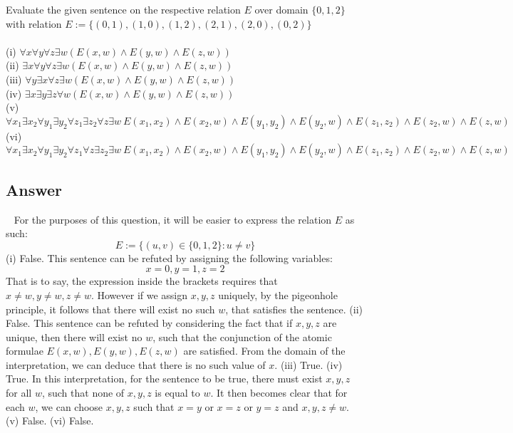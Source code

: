 \documentclass[12pt]{fphw}
\begin{document}
\begin{problem}
  Evaluate the given sentence on the respective relation $E$ over domain $\{0,1,2\}$ with relation $E := \{(0,1),(1,0),(1,2),(2,1),(2,0),(0,2)\}$\\ \\
  (i) $\forall x \forall y \forall z \exists w (E(x,w) \wedge E(y,w) \wedge E(z,w))$ \\
  (ii) $\exists x \forall y \forall z \exists w (E(x,w) \wedge E(y,w) \wedge E(z,w))$ \\
  (iii) $\forall y \exists x \forall z \exists w (E(x,w) \wedge E(y,w) \wedge E(z,w))$ \\
  (iv) $\exists x \exists y \exists z \forall w (E(x,w) \wedge E(y,w) \wedge E(z,w))$ \\
  (v) $\forall x_1 \exists x_2 \forall y_1 \exists y_2 \forall z_1 \exists z_2 \forall z \exists w \ E(x_1, x_2) \wedge E(x_2, w) \wedge E(y_1, y_2) \wedge E(y_2, w) \wedge E(z_1, z_2) \wedge E(z_2, w) \wedge E(z,w)$ \\
  (vi) $\forall x_1 \exists x_2 \forall y_1 \exists y_2 \forall z_1 \forall z \exists z_2 \exists w \ E(x_1, x_2) \wedge E(x_2, w) \wedge E(y_1, y_2) \wedge E(y_2, w) \wedge E(z_1, z_2) \wedge E(z_2, w) \wedge E(z,w)$
\end{problem}

\subsection*{Answer} \ \newline
For the purposes of this question, it will be easier to express the relation $E$ as such:
$$
E := \{(u,v) \in \{0,1,2\} : u \neq v \}
$$
(i) False. This sentence can be refuted by assigning the following variables:
$$
x = 0, y = 1, z = 2
$$
That is to say, the expression inside the brackets requires that $x \neq w, y \neq w, z \neq w$. However if we assign $x,y,z$ uniquely, by the pigeonhole principle, it follows that there will exist no such $w$, that satisfies the sentence. \newline \newline
(ii) False. This sentence can be refuted by considering the fact that if $x, y, z$ are unique, then there will exist no $w$, such that the conjunction of the atomic formulae $E(x,w), E(y,w), E(z,w)$ are satisfied. From the domain of the interpretation, we can deduce that there is no such value of $x$. \newline \newline
(iii) True. \newline \newline
(iv) True. In this interpretation, for the sentence to be true, there must exist $x,y,z$ for all $w$, such that none of $x,y,z$ is equal to $w$. It then becomes clear that for each $w$, we can choose $x,y,z$ such that $x=y$ or $x = z$ or $y = z$ and $x,y,z \neq w$.\newline \newline
(v) False. \newline \newline
(vi) False. \newline \newline
\end{document}
